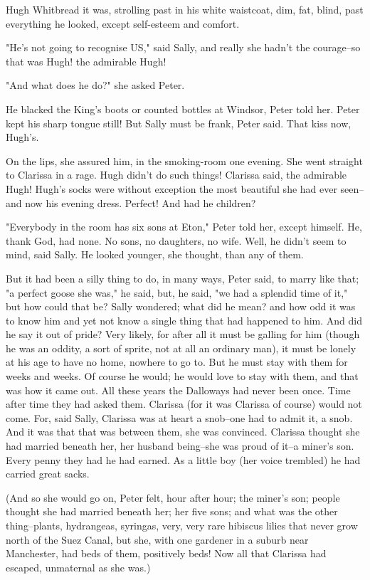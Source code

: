 \documentclass[lang=cn,10pt]{elegantbook}
\begin{document}
Hugh Whitbread it was, strolling past in his white waistcoat, dim,
fat, blind, past everything he looked, except self-esteem and
comfort.

"He's not going to recognise US," said Sally, and really she hadn't
the courage--so that was Hugh! the admirable Hugh!

"And what does he do?" she asked Peter.

He blacked the King's boots or counted bottles at Windsor, Peter
told her.  Peter kept his sharp tongue still!  But Sally must be
frank, Peter said.  That kiss now, Hugh's.

On the lips, she assured him, in the smoking-room one evening.  She
went straight to Clarissa in a rage.  Hugh didn't do such things!
Clarissa said, the admirable Hugh!  Hugh's socks were without
exception the most beautiful she had ever seen--and now his evening
dress.  Perfect!  And had he children?

"Everybody in the room has six sons at Eton," Peter told her,
except himself.  He, thank God, had none.  No sons, no daughters,
no wife.  Well, he didn't seem to mind, said Sally.  He looked
younger, she thought, than any of them.

But it had been a silly thing to do, in many ways, Peter said, to
marry like that; "a perfect goose she was," he said, but, he said,
"we had a splendid time of it," but how could that be?  Sally
wondered; what did he mean? and how odd it was to know him and yet
not know a single thing that had happened to him.  And did he say
it out of pride?  Very likely, for after all it must be galling for
him (though he was an oddity, a sort of sprite, not at all an
ordinary man), it must be lonely at his age to have no home,
nowhere to go to.  But he must stay with them for weeks and weeks.
Of course he would; he would love to stay with them, and that was
how it came out.  All these years the Dalloways had never been
once.  Time after time they had asked them.  Clarissa (for it was
Clarissa of course) would not come.  For, said Sally, Clarissa was
at heart a snob--one had to admit it, a snob.  And it was that that
was between them, she was convinced.  Clarissa thought she had
married beneath her, her husband being--she was proud of it--a
miner's son.  Every penny they had he had earned.  As a little boy
(her voice trembled) he had carried great sacks.

(And so she would go on, Peter felt, hour after hour; the miner's
son; people thought she had married beneath her; her five sons; and
what was the other thing--plants, hydrangeas, syringas, very, very
rare hibiscus lilies that never grow north of the Suez Canal, but
she, with one gardener in a suburb near Manchester, had beds of
them, positively beds!  Now all that Clarissa had escaped,
unmaternal as she was.)
\end{document}
